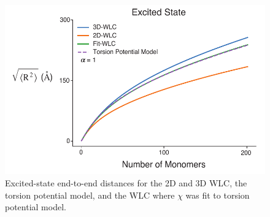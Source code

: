 \begin{figure}[hbt!]
    \centering
    \includegraphics{figures/append_tor_model/trip_wlc_fit.pdf}
    \caption[Doped-state End-to-end Distance of the 2D-WLC, 3D-WLC, Torsion Potential Model, and Fit-WLC]{Excited-state end-to-end distances for the 2D and 3D WLC, the torsion potential model, and the WLC where $\chi$ was fit to torsion potential model.}
    \label{fig:e_wlc}
\end{figure}

\clearpage

